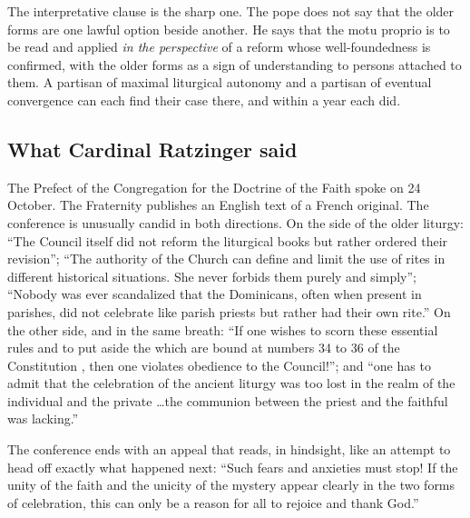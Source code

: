 The interpretative clause is the sharp one. The pope does not say that
the older forms are one lawful option beside another. He says that the
motu proprio is to be read and applied \emph{in the perspective} of a
reform whose well-foundedness is confirmed, with the older forms as a
sign of understanding to persons attached to them. A partisan of maximal
liturgical autonomy and a partisan of eventual convergence can each find
their case there, and within a year each did.

\subsection{What Cardinal Ratzinger said}

The Prefect of the Congregation for the Doctrine of the Faith spoke on 24
October. The Fraternity publishes an English text of a French original.
The conference is unusually candid in both directions. On the side of the
older liturgy: ``The Council itself did not reform the liturgical books
but rather ordered their revision''; ``The authority of the Church can
define and limit the use of rites in different historical situations. She
never forbids them purely and simply''; ``Nobody was ever scandalized
that the Dominicans, often when present in parishes, did not celebrate
like parish priests but rather had their own rite.'' On the other side,
and in the same breath: ``If one wishes to scorn these essential rules
and to put aside the  which are bound at numbers
34 to 36 of the Constitution , then one violates
obedience to the Council!''; and ``one has to admit that the celebration
of the ancient liturgy was too lost in the realm of the individual and
the private \ldots the communion between the priest and the faithful was
lacking.''

The conference ends with an appeal that reads, in hindsight, like an
attempt to head off exactly what happened next: ``Such fears and
anxieties must stop! If the unity of the faith and the unicity of the
mystery appear clearly in the two forms of celebration, this can only be
a reason for all to rejoice and thank God.''

